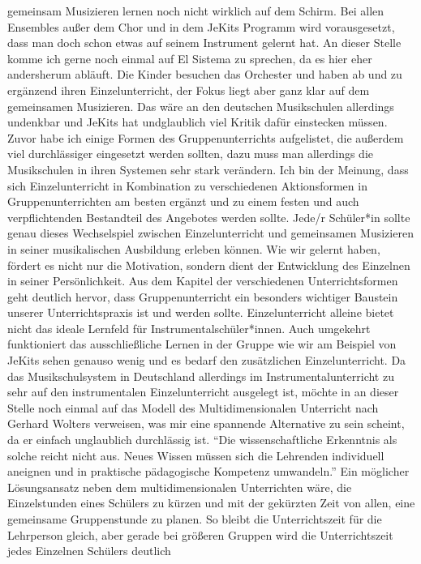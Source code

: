 gemeinsam Musizieren lernen noch nicht wirklich auf dem Schirm. Bei allen
Ensembles außer dem Chor und in dem JeKits Programm wird vorausgesetzt, dass man
doch schon etwas auf seinem Instrument gelernt hat. An dieser Stelle komme ich
gerne noch einmal auf El Sistema zu sprechen, da es hier eher andersherum
abläuft. Die Kinder besuchen das Orchester und haben ab und zu ergänzend ihren
Einzelunterricht, der Fokus liegt aber ganz klar auf dem gemeinsamen Musizieren.
Das wäre an den deutschen Musikschulen allerdings undenkbar und JeKits hat
undglaublich viel Kritik dafür einstecken müssen. Zuvor habe ich einige Formen
des Gruppenunterrichts aufgelistet, die außerdem viel durchlässiger eingesetzt
werden sollten, dazu muss man allerdings die Musikschulen in ihren Systemen sehr
stark verändern. Ich bin der Meinung, dass sich Einzelunterricht in Kombination
zu verschiedenen Aktionsformen in Gruppenunterrichten am besten ergänzt und zu
einem festen und auch verpflichtenden Bestandteil des Angebotes werden sollte.
Jede/r Schüler*in sollte genau dieses Wechselspiel zwischen Einzelunterricht und
gemeinsamen Musizieren in seiner musikalischen Ausbildung erleben können. Wie
wir gelernt haben, fördert es nicht nur die Motivation, sondern dient der
Entwicklung des Einzelnen in seiner Persönlichkeit. Aus dem Kapitel der
verschiedenen Unterrichtsformen geht deutlich hervor, dass Gruppenunterricht ein
besonders wichtiger Baustein unserer Unterrichtspraxis ist und werden sollte.
Einzelunterricht alleine bietet nicht das ideale Lernfeld für
Instrumentalschüler*innen. Auch umgekehrt funktioniert das ausschließliche
Lernen in der Gruppe wie wir am Beispiel von JeKits sehen genauso wenig und es
bedarf den zusätzlichen Einzelunterricht. Da das Musikschulsystem in Deutschland
allerdings im Instrumentalunterricht zu sehr auf den instrumentalen
Einzelunterricht ausgelegt ist, möchte in an dieser Stelle noch einmal auf das
Modell des Multidimensionalen Unterricht nach Gerhard Wolters verweisen, was mir
eine spannende Alternative zu sein scheint, da er einfach unglaublich
durchlässig ist. \enquote{Die wissenschaftliche Erkenntnis als solche reicht
nicht aus. Neues Wissen müssen sich die Lehrenden individuell aneignen und in
praktische pädagogische Kompetenz umwandeln.}
\autocite[10]{losert:die_kunst_zu_unterrichten} Ein möglicher Lösungsansatz
neben dem multidimensionalen Unterrichten wäre, die Einzelstunden eines Schülers
zu kürzen und mit der gekürzten Zeit von allen, eine gemeinsame Gruppenstunde zu
planen. So bleibt die Unterrichtszeit für die Lehrperson gleich, aber gerade bei
größeren Gruppen wird die Unterrichtszeit jedes Einzelnen Schülers deutlich
